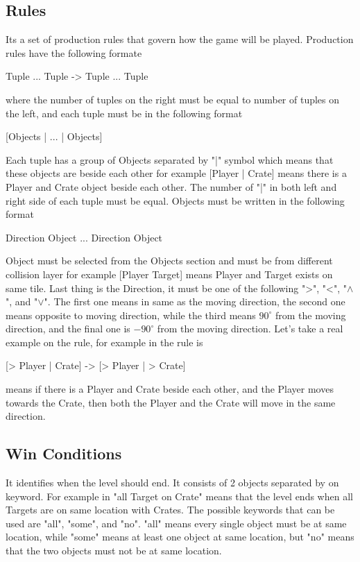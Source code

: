 \subsection{Rules}
Its a set of production rules that govern how the game will be played. Production rules have the following formate
\begin{center}{Tuple ... Tuple -> Tuple ... Tuple}\end{center}
where the number of tuples on the right must be equal to number of tuples on the left, and each tuple must be in the following format
\begin{center}{[Objects | ... | Objects]}\end{center}
Each tuple has a group of Objects separated by "|" symbol which means that these objects are beside each other for example [Player | Crate] means there is a Player and Crate object beside each other. The number of "|" in both left and right side of each tuple must be equal. Objects must be written in the following format
\begin{center}{Direction Object ... Direction Object}\end{center}
Object must be selected from the Objects section and must be from different collision layer for example [Player Target] means Player and Target exists on same tile. Last thing is the Direction, it must be one of the following ">", "<", "$\wedge$", and "$\vee$". The first one means in same as the moving direction, the second one means opposite to moving direction, while the third means $90^{\circ}$ from the moving direction, and the final one is $-90^{\circ}$ from the moving direction. Let's take a real example on the rule, for example in  the rule is
\begin{center}{[> Player | Crate] -> [> Player | > Crate]}\end{center}
means if there is a Player and Crate beside each other, and the Player moves towards the Crate, then both the Player and the Crate will move in the same direction.
\subsection{Win Conditions} 
It identifies when the level should end. It consists of 2 objects separated by on keyword. For example in  "all Target on Crate" means that the level ends when all Targets are on same location with Crates. The possible keywords that can be used are "all", "some", and "no". "all" means every single object must be at same location, while "some" means at least one object at same location, but "no" means that the two objects must not be at same location.

